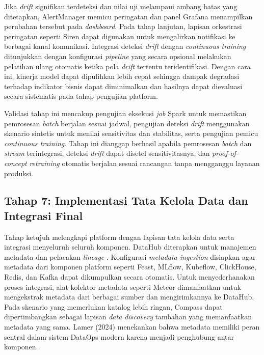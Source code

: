 Jika \textit{drift} signifikan terdeteksi dan nilai uji melampaui ambang batas yang ditetapkan, AlertManager memicu peringatan dan panel Grafana menampilkan perubahan tersebut pada \textit{dashboard}. Pada tahap lanjutan, lapisan orkestrasi peringatan seperti Siren dapat digunakan untuk mengalirkan notifikasi ke berbagai kanal komunikasi. Integrasi deteksi \textit{drift} dengan \textit{continuous training} ditunjukkan dengan konfigurasi \textit{pipeline} yang secara opsional melakukan pelatihan ulang otomatis ketika pola \textit{drift} tertentu teridentifikasi. Dengan cara ini, kinerja model dapat dipulihkan lebih cepat sehingga dampak degradasi terhadap indikator bisnis dapat diminimalkan dan hasilnya dapat dievaluasi secara sistematis pada tahap pengujian platform.

Validasi tahap ini mencakup pengujian eksekusi \textit{job} Spark untuk memastikan pemrosesan \textit{batch} berjalan sesuai jadwal, pengujian deteksi \textit{drift} menggunakan skenario sintetis untuk menilai sensitivitas dan stabilitas, serta pengujian pemicu \textit{continuous training}. Tahap ini dianggap berhasil apabila pemrosesan \textit{batch} dan \textit{stream} terintegrasi, deteksi \textit{drift} dapat disetel sensitivitasnya, dan \textit{proof-of-concept} \textit{retraining} otomatis berjalan sesuai rancangan tanpa mengganggu layanan produksi.

\subsection{Tahap 7: Implementasi Tata Kelola Data dan Integrasi Final}

Tahap ketujuh melengkapi platform dengan lapisan tata kelola data serta integrasi menyeluruh seluruh komponen. DataHub diterapkan untuk manajemen metadata dan pelacakan \textit{lineage} \parencite{datahub2024}. Konfigurasi \textit{metadata ingestion} disiapkan agar metadata dari komponen platform seperti Feast, MLflow, Kubeflow, ClickHouse, Redis, dan Kafka dapat dikumpulkan secara otomatis. Untuk menyederhanakan proses integrasi, alat kolektor metadata seperti Meteor dimanfaatkan untuk mengekstrak metadata dari berbagai sumber dan mengirimkannya ke DataHub. Pada skenario yang memerlukan katalog lebih ringan, Compass dapat dipertimbangkan sebagai lapisan \textit{data discovery} tambahan yang memanfaatkan metadata yang sama. Lamer (2024) menekankan bahwa metadata memiliki peran sentral dalam sistem DataOps modern karena menjadi penghubung antar komponen.

